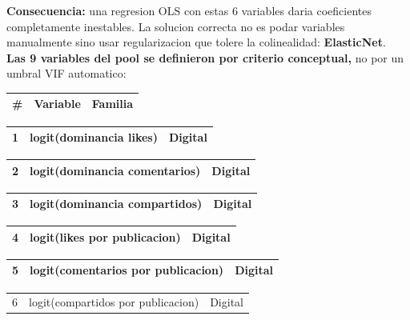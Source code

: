 \documentclass[11pt,a4paper]{article}
\begin{document}
{\textbf{Consecuencia:} una regresion OLS con estas 6 variables daria coeficientes completamente inestables. La solucion correcta no es podar variables manualmente sino usar regularizacion que tolere la colinealidad: \textbf{ElasticNet}.\\[2pt]

\textbf{Las 9 variables del pool se definieron por criterio conceptual,} no por un umbral VIF automatico:\\[2pt]

\begin{center}
\begin{tabular}{lll}
\hline
# & Variable & Familia \\
\hline
\end{tabular}
\end{center}
\begin{center}
\begin{tabular}{lll}
\hline
1 & logit(dominancia likes) & Digital \\
\hline
\end{tabular}
\end{center}
\begin{center}
\begin{tabular}{lll}
\hline
2 & logit(dominancia comentarios) & Digital \\
\hline
\end{tabular}
\end{center}
\begin{center}
\begin{tabular}{lll}
\hline
3 & logit(dominancia compartidos) & Digital \\
\hline
\end{tabular}
\end{center}
\begin{center}
\begin{tabular}{lll}
\hline
4 & logit(likes por publicacion) & Digital \\
\hline
\end{tabular}
\end{center}
\begin{center}
\begin{tabular}{lll}
\hline
5 & logit(comentarios por publicacion) & Digital \\
\hline
\end{tabular}
\end{center}
\begin{center}
\begin{tabular}{lll}
\hline
6 & logit(compartidos por publicacion) & Digital \\

\end{tabular}
\end{center}}
\end{document}
